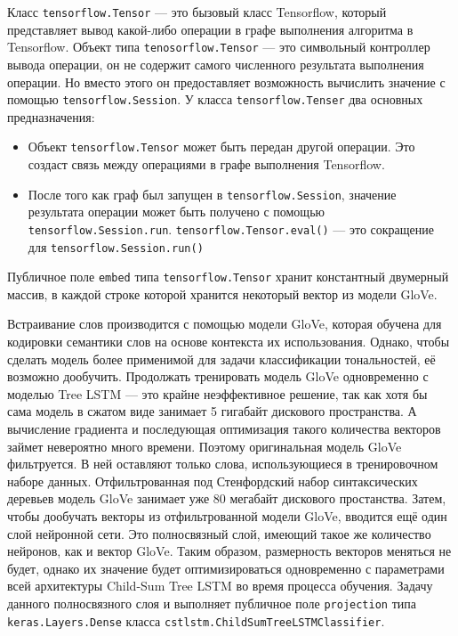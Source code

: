 Класс \texttt{tensorflow.Tensor} --- это бызовый класс Tensorflow, который представляет вывод какой-либо операции в графе выполнения алгоритма в Tensorflow. Объект типа \texttt{tenosorflow.Tensor} --- это символьный контроллер вывода операции, он не содержит самого численного результата выполнения операции. Но вместо этого он предоставляет возможность вычислить значение с помощью \texttt{tensorflow.Session}. У класса \texttt{tensorflow.Tenser} два основных предназначения:
\begin{itemize}
\item Объект \texttt{tensorflow.Tensor} может быть передан другой операции. Это создаст связь между операциями в графе выполнения Tensorflow.
\item После того как граф был запущен в \texttt{tensorflow.Session}, значение результата операции может быть получено с помощью \texttt{tensorflow.Session.run}. \texttt{tensorflow.Tensor.eval()} --- это сокращение для \texttt{tensorflow.Session.run()}
\end{itemize}

Публичное поле \texttt{embed} типа \texttt{tensorflow.Tensor} хранит константный двумерный массив, в каждой строке которой хранится некоторый вектор из модели GloVe.

Встраивание слов производится с помощью модели GloVe, которая обучена для кодировки семантики слов на основе контекста их использования. Однако, чтобы сделать модель более применимой для задачи классификации тональностей, её возможно дообучить. Продолжать тренировать модель GloVe одновременно с моделью Tree LSTM --- это крайне неэффективное решение, так как хотя бы сама модель в сжатом виде занимает 5 гигабайт дискового пространства. А вычисление градиента и последующая оптимизация такого количества векторов займет невероятно много времени. Поэтому оригинальная модель GloVe фильтруется. В ней оставляют только слова, использующиеся в тренировочном наборе данных. Отфильтрованная под Стенфордский набор синтаксических деревьев модель GloVe занимает уже 80 мегабайт дискового простанства. Затем, чтобы дообучать векторы из отфильтрованной модели GloVe, вводится ещё один слой нейронной сети. Это полносвязный слой, имеющий такое же количество нейронов, как и вектор GloVe. Таким образом, размерность векторов меняться не будет, однако их значение будет  оптимизироваться одновременно с параметрами всей архитектуры Child-Sum Tree LSTM во время процесса обучения. Задачу данного полносвязного слоя и выполняет публичное поле \texttt{projection} типа \texttt{keras.Layers.Dense} класса \texttt{cstlstm.ChildSumTreeLSTMClassifier}.

